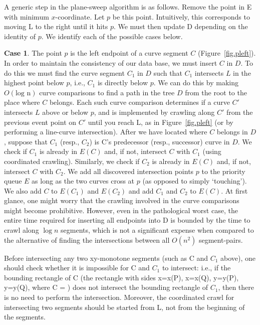 A generic step in the plane-sweep algorithm is as follows.
Remove the point in E with minimum $x$-coordinate.
Let $p$ be this point.
Intuitively, this corresponds to moving L to the right until it hits $p$.
We must then update D depending on the identity of $p$.
We identify each of the possible cases below.

{\bf Case 1}. The point $p$ is the left endpoint of a curve segment $C$ 
(Figure~\ref{fig.pleft}).
In order to maintain the consistency of our data base, we must insert $C$ in $D$.
To do this we must find the curve segment $C_{1}$ in $D$ such that $C_{1}$
intersects $L$ in the highest point below $p$, i.e., $C_{1}$ is directly below $p$.
We can do this by making $O(\mbox{log n})$ curve comparisons to find
a path in the tree $D$ from the root to the place where $C$ belongs.
Each such curve comparison determines if a curve $C'$ intersects $L$ above or below $p$,
and is implemented by crawling along $C'$ from the previous event point on $C'$ until you 
reach L, as in Figure~\ref{fig.pleft} (or by performing a line-curve intersection).
After we have located where $C$ belongs in $D$, suppose that $C_{1}$ (resp., $C_{2}$)
is C's predecessor (resp., successor) curve in $D$.
We check if $C_{1}$ is already in $E(C)$ and, if not, intersect $C$ with $C_{1}$
(using coordinated crawling).
Similarly, we check if $C_{2}$ is already in $E(C)$ and, if not, intersect $C$ with $C_{2}$.
We add all discovered intersection points $p$ to the priority queue $E$ as long 
as the two curves cross at $p$ (as opposed to simply `touching').
We also add $C$ to $E(C_{1})$ and $E(C_{2})$ and add $C_{1}$ and $C_{2}$ to $E(C)$.
At first glance, one might worry that the crawling involved in the curve 
	comparisons might become prohibitive.  However, even in the pathological worst case,
	the entire time required for inserting all endpoints into D is bounded by the time to
	crawl along $\log n$ segments, which is not a significant expense when compared to
	the alternative of finding the intersections between all $O(n^{2})$ segment-pairs.

Before intersecting any two xy-monotone segments (such as C and $C_{1}$ above),
one should check whether it is impossible for C and $C_{1}$ to intersect: i.e., if the 
bounding rectangle of C (the rectangle with sides x=x(P), x=x(Q), y=y(P), y=y(Q), where 
C = ) does not intersect 
the bounding rectangle of $C_{1}$, then there is no need to perform the intersection.
Moreover, the coordinated crawl for intersecting two segments should be started from L, not 
from the beginning of the segments.

